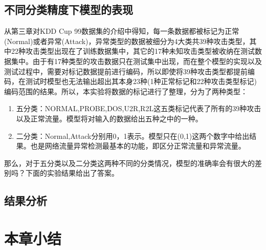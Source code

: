 \subsection{不同分类精度下模型的表现}

从第三章对KDD Cup 99数据集的介绍中得知，每一条数据都被标记为正常(Normal)或者异常(Attack)，异常类型的数据被细分为4大类共39种攻击类型，其中22种攻击类型出现在了训练数据集中，其它的17种未知攻击类型被收纳在测试数据集中。由于有17种类型的攻击数据只在测试集中出现，而在整个模型的实现以及测试过程中，需要对标记数据提前进行编码，所以即使将39种攻击类型都提前编码，在测试时模型也无法输出超出其本身23种(1种正常标记和22种攻击类型标记)编码范围的结果。所以，本实验将数据的标记进行了整理，分为了两种类型：
\begin{enumerate}
    \item 五分类：NORMAL,PROBE,DOS,U2R,R2L这五类标记代表了所有的39种攻击以及正常流量。模型将对输入的数据给出五种之中的一种。
    \item 二分类：Normal,Attack分别用0，1表示。模型只在(0,1)这两个数字中给出结果。也是网络流量异常检测最基本的功能，即区分正常流量和异常流量。
\end{enumerate}

那么，对于五分类以及二分类这两种不同的分类情况，模型的准确率会有很大的差别吗？下面的实验结果给出了答案。

\subsection{结果分析}

\section{本章小结}